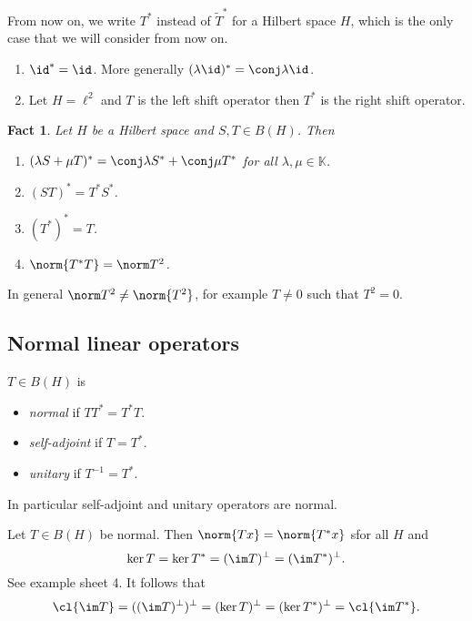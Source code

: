 \documentclass[a4paper]{article}
\newtheorem*{fact}{Fact}
\newcommand{\K}{{\mathbb{K}}} %
\begin{document}
From now on, we write \(T^*\) instead of \(\tilde T^*\) for a Hilbert space \(H\), which is the only case that we will consider from now on.

\begin{eg}\leavevmode
  \begin{enumerate}
  \item \(\id^* = \id\). More generally \((\lambda \id)^* = \conj \lambda \id\).
  \item Let \(H = \ell^2\) and \(T\) is the left shift operator then \(T^*\) is the right shift operator.
  \end{enumerate}
\end{eg}

\begin{fact}
  Let \(H\) be a Hilbert space and \(S, T \in B(H)\). Then
  \begin{enumerate}
  \item \((\lambda S + \mu T)^* = \conj \lambda S^* + \conj \mu T^*\) for all \(\lambda, \mu \in \K\).
  \item \((ST)^* = T^*S^*\).
  \item \((T^*)^* = T\).
  \item \(\norm{T^* T} = \norm T^2\).
  \end{enumerate}
\end{fact}

\begin{note}
  In general \(\norm T^2 \neq \norm{T^2}\), for example \(T \neq 0\) such that \(T^2 = 0\).
\end{note}

\subsection{Normal linear operators}

\begin{definition}
  \(T \in B(H)\) is
  \begin{itemize}
  \item \emph{normal} if \(TT^* = T^*T\).
  \item \emph{self-adjoint} if \(T = T^*\).
  \item \emph{unitary} if \(T^{-1} = T^*\).
  \end{itemize}
\end{definition}

In particular self-adjoint and unitary operators are normal.

\begin{ex}
  Let \(T \in B(H)\) be normal. Then \(\norm{Tx} = \norm{T^*x}\) sfor all \(H\) and
  \[
    \ker T = \ker T^* = (\im T)^\perp = (\im T^*)^\perp.
  \]
  See example sheet 4. It follows that
  \[
    \cl{\im T} = ((\im T)^\perp)^\perp = (\ker T)^\perp = (\ker T^*)^\perp = \cl{\im T^*}.
  \]
\end{ex}
\end{document}
